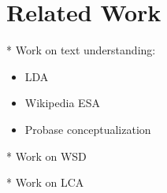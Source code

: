 \section{Related Work}
\label{sec:related}

\noindent
* Work on text understanding:
\begin{itemize}
\item LDA \cite{BleiNJ03}
\item Wikipedia ESA \cite{GabrilovichM07:ESA} 
\item Probase conceptualization \cite{Song11:Conceptualize}
\end{itemize}

\noindent
* Work on WSD \cite{StrubeP06, Navigli09:WSD, Resnik95, Jiang97:taxonomySimilarity,Mihalcea07:WSD}

\noindent
* Work on LCA \cite{BenderFPSS05:LCA,CzumajKL07:LCA}
